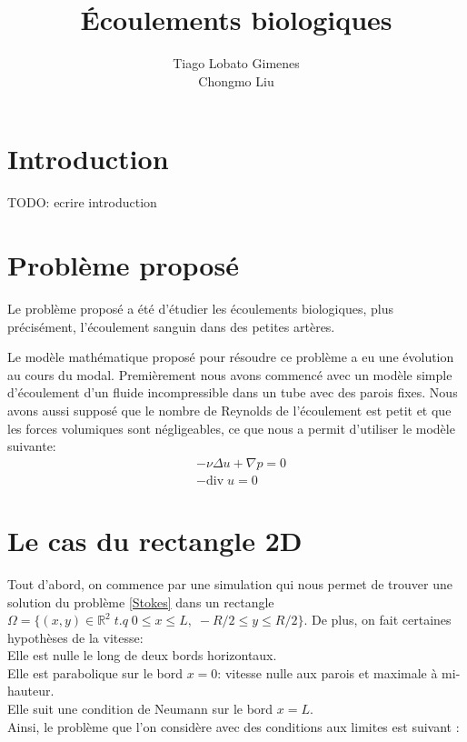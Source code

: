 \documentclass[11pt,a4paper]{article}
\title{Écoulements biologiques}
\author{Tiago Lobato Gimenes \\ Chongmo Liu}
\numberwithin{equation}{subsection}
\numberwithin{figure}{subsection}
\begin{document}
\setlength{\parindent}{0pt}
\maketitle

%
%
\section*{Introduction}

TODO: ecrire introduction

%
%
\section{Problème proposé}

Le problème proposé a été d'étudier les écoulements biologiques, plus précisément, l'écoulement sanguin dans des petites artères.
 
Le modèle mathématique proposé pour résoudre ce problème a eu une évolution au cours du modal. Premièrement nous avons commencé avec un modèle simple d'écoulement d'un fluide incompressible dans un tube avec des parois fixes. Nous avons aussi supposé que le nombre de Reynolds de  l'écoulement est petit et que les forces volumiques sont négligeables, ce que nous a permit d'utiliser le modèle suivante:
\begin{equation}
\begin{aligned}
& -\nu \Delta u + \nabla p = 0 \\
& -\mathrm{div}\;u = 0 \label{Stokes}
\end{aligned}
\end{equation}

\section{Le cas du rectangle 2D}
Tout d'abord, on commence par une simulation qui nous permet de trouver une solution du problème \ref{Stokes} dans un rectangle $\Omega = \{(x,y) \in \mathbb{R}^2 \;t.q\; 0 \leq x \leq L, \; -R/2 \leq y \leq R/2\}$. De plus, on fait certaines hypothèses de la vitesse:\\
Elle est nulle le long de deux bords horizontaux.\\
Elle est parabolique sur le bord $x=0$: vitesse nulle aux parois et maximale à mi-hauteur.\\
Elle suit une condition de Neumann sur le bord $x=L$.\\
Ainsi, le problème que l’on considère avec des conditions aux limites est suivant :\\
\end{document}
